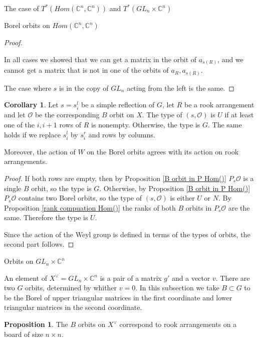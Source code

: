 \documentclass[12pt]{article}
\newcommand{\C}{\mathbb{C}}
\newcommand{\s}{\mathcal{O}}
\theoremstyle{plain}
\theoremstyle{definition}
\newtheorem{prop}[theorem]{Proposition}
\newtheorem{cor}[theorem]{Corollary}
\begin{document}
\begin{subsection}{The case of $T^*(Hom(\C^n,\C^n))$ and $T^*(GL_n\times \C^n)$}
\begin{subsubsection}{Borel orbits on $Hom(\C^n,\C^n)$}
\begin{proof}
\begin{itemize}
        \end{itemize}

        In all cases we showed that we can get a matrix in the orbit of $a_{s(R)}$, and we cannot get a matrix that is not in one of the orbits of $a_{R},a_{s(R)}$.

        The case where $s$ is in the copy of $GL_{n}$ acting from the left is the same.
        
    \end{proof}

    \begin{cor}\label{cor: action agrees with rooks 1}
        Let $s=s^l_i$ be a simple reflection of $G$, let $R$ be a rook arrangement and let $\s$ be the corresponding $B$ orbit on $X$. The type of $(s,\s)$ is $U$ if at least one of the $i,i+1$ rows of $R$ is nonempty. Otherwise, the type is $G$. The same holds if we replace $s^l_i$ by $s^r_i$ and rows by columns.

        Moreover, the action of $W$ on the Borel orbits agrees with its action on rook arrangements.
    \end{cor}

    \begin{proof}
        If both rows are empty, then by Proposition \ref{B orbit in P Hom()} $P_s\s$ is a single $B$ orbit, so the type is $G$. Otherwise, by Proposition \ref{B orbit in P Hom()} $P_s\s$ contains two Borel orbits, so the type of $(s,\s)$ is either $U$ or $N$. By Proposition \ref{rank compuation Hom()} the ranks of both $B$ orbits in $P_s\s$ are the same. Therefore the type is $U$.

        Since the action of the Weyl group is defined in terms of the types of orbits, the second part follows.
    \end{proof}
        
    \end{subsubsection}

    \begin{subsubsection}{Orbits on $GL_n\times \C^n$}

    An element of $X^\vee=GL_n\times \C^n$ is a pair of a matrix $g'$ and a vector $v$. There are two $G$ orbits, determined by whither $v=0$. In this subsection we take $B\subset G$ to be the Borel of upper triangular matrices in the first coordinate and lower triangular matrices in the second coordinate.

    \begin{prop}\label{Borel orbits on X^}
        The $B$ orbits on $X^\vee$ correspond to rook arrangements on a board of size $n\times n$.
    \end{prop}


\end{subsubsection}
\end{subsection}
\end{document}
